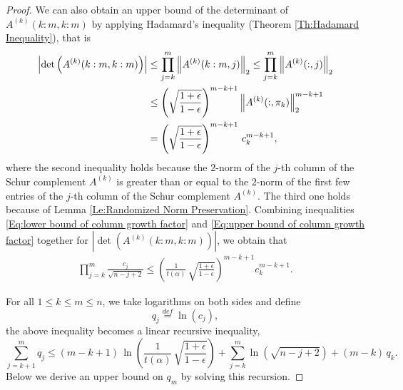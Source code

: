 \documentclass[11pt]{article}
\begin{document}
\begin{proof}
We can also obtain an upper bound of the determinant of $A^{(k)}(k : m, k : m)$ by applying Hadamard's inequality (Theorem \ref{Th:Hadamard Inequality}), that is 
\begin{align}\label{Eq:upper bound of column growth factor}
\left| \det \left( A^{(k)}(k : m, k : m) \right) \right| & \le \prod_{j = k}^m \left\| A^{(k)} (k : m, j) \right\|_2 \le \prod_{j = k}^m \left\| A^{(k)}( : , j) \right\|_2   \notag \\
& \le \left( \sqrt{\frac{1 + \epsilon}{1 - \epsilon}} \right)^{m - k + 1} \left\| A^{(k)} ( : , \pi_k) \right\|_2^{m - k + 1} \notag \\
& = \left( \sqrt{\frac{1 + \epsilon}{1 - \epsilon}} \right)^{m - k + 1} \, c_k^{m - k + 1},
\end{align}
where the second inequality holds because the $2$-norm of the $j$-th column of the Schur complement $A^{(k)}$ is greater than or equal to the $2$-norm of the first few entries of the $j$-th column of the Schur complement $A^{(k)}$. The third one holds because of Lemma \ref{Le:Randomized Norm Preservation}. Combining inequalities \eqref{Eq:lower bound of column growth factor} and \eqref{Eq:upper bound of column growth factor} together for $\left| \det\left(A^{(k)} (k : m, k : m) \right) \right|$, we obtain that 
\begin{align*}
\prod_{j = k}^m \frac{c_j}{\sqrt{n - j + 2}} \le \left( \frac{1}{t(\alpha)}\, \sqrt{\frac{1 + \epsilon}{1 - \epsilon}} \right)^{m - k + 1} c_k^{m - k + 1}.
\end{align*}

For all $1\le k \le m \le n$, we take logarithms on both sides and define
$$
q_j \stackrel{def}{=} \ln(c_j),
$$
the above inequality becomes a linear recursive inequality, 
$$
 \sum_{j = k + 1}^m q_j \le (m - k + 1) \, \ln \left(\frac{1}{t(\alpha)}\,  \sqrt{\frac{1 + \epsilon}{1 - \epsilon}} \right) + \sum_{j = k}^m \ln \left( \sqrt{n - j + 2} \right) + (m - k) \, q_k.
$$
\noindent Below we derive an upper bound on $q_m$ by solving this recursion. 


\end{proof}
\end{document}
